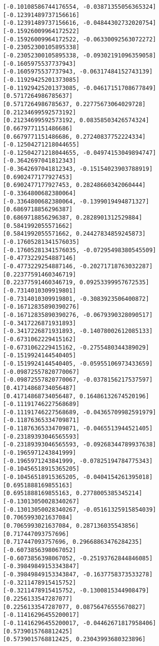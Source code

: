 \documentclass[11pt]{article}
\begin{document}
\begin{Verbatim}[commandchars=\\\{\}]
[-0.10108586744176554, -0.03871355056365324]
[-0.12391489737156616]
[-0.12391489737156616, -0.04844302732020754]
[-0.15926009964172522]
[-0.15926009964172522, -0.06330092563072272]
[-0.23052300105895338]
[-0.23052300105895338, -0.09302191096359058]
[-0.1605975537737943]
[-0.1605975537737943, -0.06317484152743139]
[-0.11929425201373085]
[-0.11929425201373085, -0.04617151708677849]
[0.5717264986785637]
[0.5717264986785637, 0.22775673064029728]
[0.21234699592573192]
[0.21234699592573192, 0.08358503426574324]
[0.6679771151486686]
[0.6679771151486686, 0.27240837752224334]
[-0.12504271218044655]
[-0.12504271218044655, -0.04974153049894747]
[-0.3642697041812343]
[-0.3642697041812343, -0.15154023903788919]
[0.6902477177927453]
[0.6902477177927453, 0.28248660342060444]
[-0.3364800682380064]
[-0.3364800682380064, -0.1399019494871327]
[0.6869718856296387]
[0.6869718856296387, 0.2828901312529884]
[0.5841992055571662]
[0.5841992055571662, 0.24427834859245873]
[-0.17605281341576035]
[-0.17605281341576035, -0.07295498380545509]
[-0.4773229254887146]
[-0.4773229254887146, -0.20271718763032287]
[0.22377591460346719]
[0.22377591460346719, 0.09253399957672535]
[-0.7314010309919801]
[-0.7314010309919801, -0.3083923506400872]
[-0.16712835890390276]
[-0.16712835890390276, -0.0679390328090517]
[-0.3417226871931893]
[-0.3417226871931893, -0.14078002612085133]
[-0.6731062229415162]
[-0.6731062229415162, -0.2755480344389029]
[-0.1519924144540405]
[-0.1519924144540405, -0.05955106973433659]
[-0.09872557820770067]
[-0.09872557820770067, -0.0378156217537597]
[0.41714868734056487]
[0.41714868734056487, 0.16486132674520196]
[-0.11191746227568689]
[-0.11191746227568689, -0.04365709982591979]
[-0.11876365334709871]
[-0.11876365334709871, -0.0465513944521405]
[-0.23189393046565593]
[-0.23189393046565593, -0.09268344789937638]
[-0.1965971243841999]
[-0.1965971243841999, -0.07825194784775343]
[-0.10456518915365205]
[-0.10456518915365205, -0.0404154261395018]
[0.6951888169855163]
[0.6951888169855163, 0.2778005385345214]
[-0.13013050028340267]
[-0.13013050028340267, -0.05161325915854039]
[0.7065993021637084]
[0.7065993021637084, 0.287136035543856]
[0.717447093757696]
[0.717447093757696, 0.29668863476284235]
[-0.6073856398067052]
[-0.6073856398067052, -0.25193762844846085]
[-0.39849849153343847]
[-0.39849849153343847, -0.1637758373533278]
[-0.3211478915415752]
[-0.3211478915415752, -0.1300815344908479]
[0.2256133547287077]
[0.2256133547287077, 0.08756476555670827]
[-0.11416296455200017]
[-0.11416296455200017, -0.04462671817958406]
[0.5739015768812425]
[0.5739015768812425, 0.23043993680323896]

\end{Verbatim}
\end{document}
